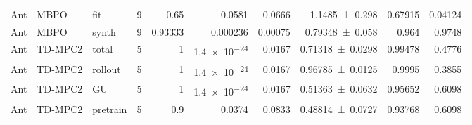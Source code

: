 {\begin{longtable}{@{}lllrrrrrrr@{}}
    Ant & MBPO & fit & \num{9} & \num{0.65} & \num{0.0581} & \num{0.0666} & \num{1.1485+-0.298} & \num{0.67915} & \num{0.04124} \\
    Ant & MBPO & synth & \num{9} & \num{0.93333} & \num{0.000236} & \num{0.00075} & \num{0.79348+-0.058} & \num{0.964} & \num{0.9748} \\
    Ant & TD-MPC2 & total & \num{5} & \num{1} & \num{1.4e-24} & \num{0.0167} & \num{0.71318+-0.0298} & \num{0.99478} & \num{0.4776} \\
    Ant & TD-MPC2 & rollout & \num{5} & \num{1} & \num{1.4e-24} & \num{0.0167} & \num{0.96785+-0.0125} & \num{0.9995} & \num{0.3855} \\
    Ant & TD-MPC2 & GU & \num{5} & \num{1} & \num{1.4e-24} & \num{0.0167} & \num{0.51363+-0.0632} & \num{0.95652} & \num{0.6098} \\
    Ant & TD-MPC2 & pretrain & \num{5} & \num{0.9} & \num{0.0374} & \num{0.0833} & \num{0.48814+-0.0727} & \num{0.93768} & \num{0.6098} \\
  \end{longtable}
}

